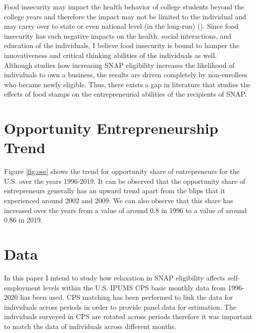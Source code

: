 \documentclass[12pt]{article}
\begin{document}
\begin{titlingpage}
Food insecurity may impact the health behavior of college students beyond the college years and therefore the impact may not be limited to the individual and may carry over to state or even national level (in the long-run) (\cite{el2019prevalence}). Since food insecurity has such negative impacts on the health, social interactions, and education of the individuals, I believe food insecurity is bound to hamper the innovativeness and critical thinking abilities of the individuals as well.  \\

Although \cite{olds2016food} studies how increasing SNAP eligibility increases the likelihood of individuals to own a business, the results are driven completely by non-enrollees who became newly eligible. Thus, there exists a gap in literature that studies the effects of food stamps on the entrepreneurial abilities of the recipients of SNAP. \\



\section*{Opportunity Entrepreneurship Trend}

Figure \ref{fig:ose} shows the trend for opportunity share of entrepreneurs for the U.S. over the years 1996-2019. It can be observed that the opportunity share of entrepreneurs generally has an upward trend apart from the blips that it experienced around 2002 and 2009. We can also observe that this share has increased over the years from a value of around 0.8 in 1996 to a value of around 0.86 in 2019. \\  










\section*{Data}

In this paper I intend to study how relaxation in SNAP eligibility affects self-employment levels within the U.S. IPUMS CPS basic monthly data from 1996-2020 has been used. CPS matching has been performed to link the data for individuals across periods in order to provide panel data for estimation. The individuals surveyed in CPS are rotated across periods therefore it was important to match the data of individuals across different months.     \\



\end{titlingpage}
\end{document}
